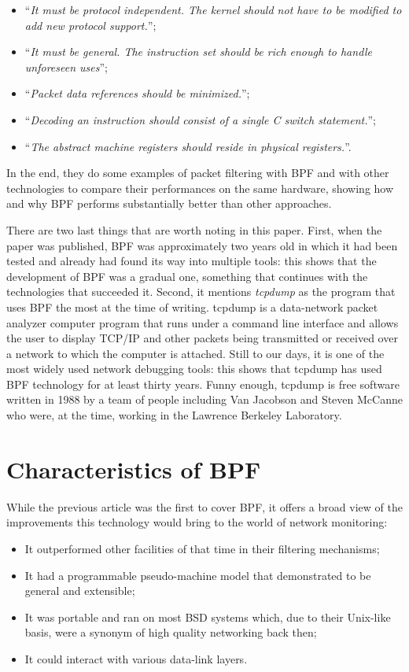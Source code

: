 \begin{itemize}
	\item 
		``\textit{It must be protocol independent. The kernel should not have to be modified to add new protocol support.}'';
	\item 
		``\textit{It must be general. The instruction set should be rich enough to handle unforeseen uses}'';
	\item 
		``\textit{Packet data references should be minimized.}'';
	\item 
		``\textit{Decoding an instruction should consist of a single C switch statement.}'';
	\item 
		``\textit{The abstract machine registers should reside in physical registers.}''.
\end{itemize}

In the end, they do some examples of packet filtering with BPF and with other technologies to compare their performances on the same hardware, showing how and why BPF performs substantially better than other approaches.

There are two last things that are worth noting in this paper.
First, when the paper was published, BPF was approximately two years old in which it had been tested and already had found its way into multiple tools: this shows that the development of BPF was a gradual one, something that continues with the technologies that succeeded it.
Second, it mentions \textit{tcpdump} as the program that uses BPF the most at the time of writing.
tcpdump is a data-network packet analyzer computer program that runs under a command line interface and allows the user to display TCP/IP and other packets being transmitted or received over a network to which the computer is attached.
Still to our days, it is one of the most widely used network debugging tools: this shows that tcpdump has used BPF technology for at least thirty years.
Funny enough, tcpdump is free software written in 1988 by a team of people including Van Jacobson and Steven McCanne who were, at the time, working in the Lawrence Berkeley Laboratory.

\section{Characteristics of BPF}

While the previous article was the first to cover BPF, it offers a broad view of the improvements this technology would bring to the world of network monitoring:

\begin{itemize}
	\item 
		It outperformed other facilities of that time in their filtering mechanisms;
	\item 
		It had a programmable pseudo-machine model that demonstrated to be general and extensible;
	\item 
		It was portable and ran on most BSD systems which, due to their Unix-like basis, were a synonym of high quality networking back then;
	\item 
		It could interact with various data-link layers.
\end{itemize}

